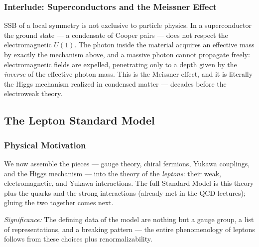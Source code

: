 \subsubsection*{Interlude: Superconductors and the Meissner Effect}

SSB of a local symmetry is not exclusive to particle physics. In a superconductor the ground state --- a condensate of Cooper pairs --- does not respect the electromagnetic $U(1)$. The photon inside the material acquires an effective mass by exactly the mechanism above, and a massive photon cannot propagate freely: electromagnetic fields are expelled, penetrating only to a depth given by the \emph{inverse} of the effective photon mass. This is the Meissner effect, and it is literally the Higgs mechanism realized in condensed matter --- decades before the electroweak theory.

\subsection{The Lepton Standard Model}\label{subsec:lec17:lsm}

\subsubsection*{Physical Motivation}

We now assemble the pieces --- gauge theory, chiral fermions, Yukawa couplings, and the Higgs mechanism --- into the theory of the \emph{leptons}: their weak, electromagnetic, and Yukawa interactions. The full Standard Model is this theory plus the quarks and the strong interactions (already met in the QCD lectures); gluing the two together comes next.


\textit{Significance:} The defining data of the model are nothing but a gauge group, a list of representations, and a breaking pattern --- the entire phenomenology of leptons follows from these choices plus renormalizability.

